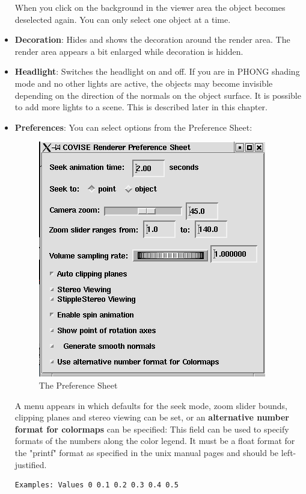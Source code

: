 \begin{itemize}
When you click on the background in the viewer area the object becomes deselected
again. You can only select one object at a time.

\item {\bf Decoration}: Hides and shows the decoration around the render area. The render area appears a
bit enlarged while decoration is hidden.

\item {\bf Headlight}: Switches the headlight on and off. If you are in PHONG shading mode and no other
lights are active, the objects may become invisible depending on the direction of
the normals on the object surface. It is possible to add more lights to a scene.
This is described later in this chapter.

\item {\bf Preferences}: You can select options from the Preference Sheet:
 \latexonly
 \begin{figure}[htp]
  \begin{center}
   \includegraphics[scale=0.7]{renderer/pict/image12}
   \caption{The Preference Sheet}
	\label{fig57}
  \end{center}
 \end{figure}
 \endlatexonly
\clearpage
 
A menu appears in which defaults for the seek mode, zoom slider bounds, clipping
planes and stereo viewing can be set, or an {\bf alternative number format for colormaps} can
be specified:\newline
This field can be used to specify formats of the numbers along the
color legend. It must be a float format for the "printf" format as
specified in the unix manual pages and should be left-justified.
\begin{verbatim}
Examples: Values 0 0.1 0.2 0.3 0.4 0.5


\end{verbatim}
\end{itemize}
